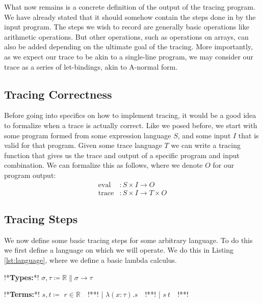     What now remains is a concrete definition of the output of the tracing program.
    We have already stated that it should somehow contain the steps done in by the input program.
    The steps we wish to record are generally basic operations like arithmetic operations.
    But other operations, such as operations on arrays, can also be added depending on the ultimate goal of the tracing.
    More importantly, as we expect our trace to be akin to a single-line program, we may consider our trace as a series of let-bindings, akin to A-normal form\cn.
    
    \subsection{Tracing Correctness} \label{sec:correctness}
        Before going into specifics on how to implement tracing, it would be a good idea to formalize when a trace is actually correct.
        Like we posed before, we start with some program formed from some expression language $S$, and some input $I$ that is valid for that program.
        Given some trace language $T$ we can write a tracing function that gives us the trace and output of a specific program and input combination.
        We can formalize this as follows, where we denote $O$ for our program output:
        \begin{align*}
            \text{eval}&:S\times I\to O\\
            \text{trace}&:S\times I\to T\times O
        \end{align*}

    \subsection{Tracing Steps} \label{sec:steps}
        We now define some basic tracing steps for some arbitrary language.
        To do this we first define a language on which we will operate.
        We do this in Listing \ref{lst:language}, where we define a basic lambda calculus.

        \begin{quicklst}[caption=Basic language, label=lst:language, gobble=12]
            !*\textbf{Types:}*!
                $\sigma,\tau\coloneqq\mathbb{R}\|\sigma\to\tau$

            !*\textbf{Terms:}*!
                $s,t\coloneqq$
                    $r\in\mathbb{R}\quad$!**!
                  | $\lambda(x:\tau).s\quad$!**!
                  | $s\ t\quad$!**!
        \end{quicklst}

